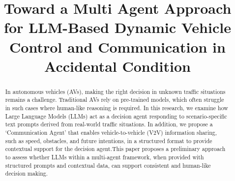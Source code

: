 \documentclass[conference]{IEEEtran}
\begin{document}

\title{Toward a Multi Agent Approach for LLM-Based Dynamic Vehicle Control and Communication in Accidental Condition}

\author{
\and

}

\maketitle

\begin{abstract}

In autonomous vehicles (AVs), making the right decision in unknown traffic situations remains a challenge. Traditional AVs rely on pre-trained models, which often struggle in such cases where human-like reasoning is required. In this research, we examine how Large Language Models (LLMs) act as a decision agent responding to scenario-specific text prompts derived from real-world traffic situations. In addition, we propose a `Communication Agent' that enables vehicle-to-vehicle (V2V) information sharing, such as speed, obstacles, and future intentions, in a structured format to provide contextual support for the decision agent.This paper proposes a preliminary approach to assess whether LLMs within a multi-agent framework, when provided with structured prompts and contextual data, can support consistent and human-like decision making.
\end{abstract}
\end{document}
